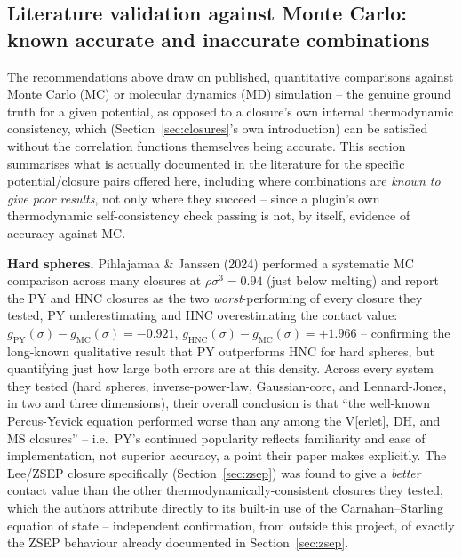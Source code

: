 \documentclass[11pt,a4paper]{article}
\begin{document}
\subsection{Literature validation against Monte Carlo: known accurate and inaccurate combinations}
\label{sec:mc-literature}

The recommendations above draw on published, quantitative comparisons
against Monte Carlo (MC) or molecular dynamics (MD) simulation -- the
genuine ground truth for a given potential, as opposed to a closure's own
internal thermodynamic consistency, which (Section~\ref{sec:closures}'s own
introduction) can be satisfied without the correlation functions themselves
being accurate. This section summarises what is actually documented in the
literature for the specific potential/closure pairs offered here, including
where combinations are \emph{known to give poor results}, not only where
they succeed -- since a plugin's own thermodynamic self-consistency check
passing is not, by itself, evidence of accuracy against MC.

\textbf{Hard spheres.} Pihlajamaa \& Janssen (2024) \cite{pihlajamaa2024}
performed a systematic MC comparison across many closures at
$\rho\sigma^3=0.94$ (just below melting) and report the PY and HNC closures
as the two \emph{worst}-performing of every closure they tested, PY
underestimating and HNC overestimating the contact value:
$g_{\mathrm{PY}}(\sigma)-g_{\mathrm{MC}}(\sigma)=-0.921$,
$g_{\mathrm{HNC}}(\sigma)-g_{\mathrm{MC}}(\sigma)=+1.966$ -- confirming the
long-known qualitative result that PY outperforms HNC for hard spheres, but
quantifying just how large both errors are at this density. Across every
system they tested (hard spheres, inverse-power-law, Gaussian-core, and
Lennard-Jones, in two and three dimensions), their overall conclusion is
that ``the well-known Percus-Yevick equation performed worse than any among
the V[erlet], DH, and MS closures'' -- i.e.\ PY's continued popularity
reflects familiarity and ease of implementation, not superior accuracy, a
point their paper makes explicitly. The Lee/ZSEP closure specifically
(Section~\ref{sec:zsep}) was found to give a \emph{better} contact value
than the other thermodynamically-consistent closures they tested, which the
authors attribute directly to its built-in use of the Carnahan--Starling
equation of state -- independent confirmation, from outside this project,
of exactly the ZSEP behaviour already documented in Section~\ref{sec:zsep}.
\end{document}
